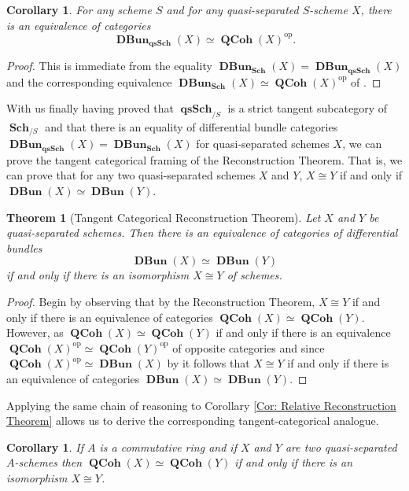 \documentclass{amsart}
\newtheorem{Theorem}[equation]{Theorem}
\newtheorem{corollary}[equation]{Corollary}
\theoremstyle{definition}
\DeclareMathOperator{\qsSch}{\mathbf{qsSch}}
\DeclareMathOperator{\op}{op}
\DeclareMathOperator{\Sch}{\mathbf{Sch}}
\DeclareMathOperator{\QCoh}{\mathbf{QCoh}}
\DeclareMathOperator{\DBun}{\mathbf{DBun}}
\numberwithin{equation}{subsection}
\begin{document}
\begin{corollary}
For any scheme $S$ and for any quasi-separated $S$-scheme $X$, there is an equivalence of categories
\[
\DBun_{\qsSch}(X) \simeq \QCoh(X)^{\op}.
\]
\end{corollary}
\begin{proof}
This is immediate from the equality $\DBun_{\Sch}(X) = \DBun_{\qsSch}(X)$ and the corresponding equivalence $\DBun_{\Sch}(X) \simeq \QCoh(X)^{\op}$ of \cite{GeoffJSDiffBunComAlg}.
\end{proof}

With us finally having proved that $\qsSch_{/S}$ is a strict tangent subcategory of $\Sch_{/S}$ and that there is an equality of differential bundle categories $\DBun_{\qsSch}(X) = \DBun_{\Sch}(X)$ for quasi-separated schemes $X$, we can prove the tangent categorical framing of the Reconstruction Theorem. That is, we can prove that for any two quasi-separated schemes $X$ and $Y$, $X \cong Y$ if and only if $\DBun(X) \simeq \DBun(Y)$.

\begin{Theorem}[Tangent Categorical Reconstruction Theorem]\label{Thm: Tan Cat Recon Thm}
Let $X$ and $Y$ be quasi-separated schemes. Then there is an equivalence of categories of differential bundles
\[
\DBun(X) \simeq \DBun(Y)
\]
if and only if there is an isomorphism $X \cong Y$ of schemes.
\end{Theorem}
\begin{proof}
Begin by observing that by the Reconstruction Theorem, $X \cong Y$ if and only if there is an equivalence of categories $\QCoh(X) \simeq \QCoh(Y)$. However, as $\QCoh(X) \simeq \QCoh(Y)$ if and only if there is an equivalence $\QCoh(X)^{\op} \simeq \QCoh(Y)^{\op}$ of opposite categories and since $\QCoh(X)^{\op} \simeq \DBun(X)$ by \cite[Theorem 4.27]{GeoffJSDiffBunComAlg} it follows that $X \cong Y$ if and only if there is an equivalence of categories $\DBun(X) \simeq \DBun(Y)$.
\end{proof}
Applying the same chain of reasoning to Corollary \ref{Cor: Relative Reconstruction Theorem} allows us to derive the corresponding tangent-categorical analogue.
\begin{corollary}\label{Cor: Relative Tan Cat Recon Thm}
If $A$ is a commutative ring and if $X$ and $Y$ are two quasi-separated $A$-schemes then $\QCoh(X) \simeq \QCoh(Y)$ if and only if there is an isomorphism $X \cong Y$.
\end{corollary}
\end{document}

